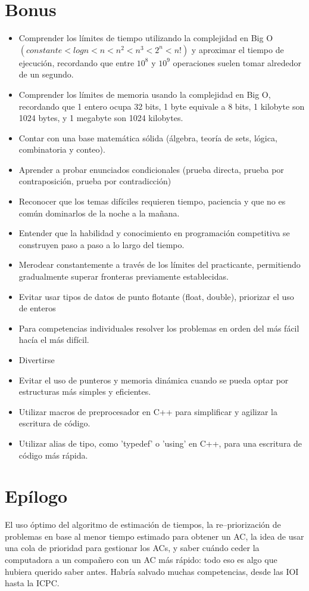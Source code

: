\section*{Bonus}
{
\begin{itemize}[leftmargin=*, itemsep=0.3em, topsep=0.3em, parsep=0pt, partopsep=0pt]
    \item Comprender los límites de tiempo utilizando la complejidad en Big O \((constante < log n < n < n^2 < n^3 < 2^n < n!)\) y aproximar el tiempo de ejecución, recordando que entre \(10^8\) y \(10^9\) operaciones suelen tomar alrededor de un segundo.
    \item Comprender los límites de memoria usando la complejidad en Big O, recordando que 1 entero ocupa 32 bits, 1 byte equivale a 8 bits, 1 kilobyte son 1024 bytes, y 1 megabyte son 1024 kilobytes.
    \item Contar con una base matemática sólida (álgebra, teoría de sets, lógica, combinatoria y conteo).
    \item Aprender a probar enunciados condicionales (prueba directa, prueba por contraposición, prueba por contradicción)
    \item Reconocer que los temas difíciles requieren tiempo, paciencia y que no es común dominarlos de la noche a la mañana.
    \item Entender que la habilidad y conocimiento en programación competitiva se construyen paso a paso a lo largo del tiempo.
    \item Merodear constantemente a través de los límites del practicante, permitiendo gradualmente superar fronteras previamente establecidas.
    \item Evitar usar tipos de datos de punto flotante (float, double), priorizar el uso de enteros
    \item Para competencias individuales resolver los problemas en orden del más fácil hacía el más difícil.
    \item Divertirse
    \item Evitar el uso de punteros y memoria dinámica cuando se pueda optar por estructuras más simples y eficientes.
    \item Utilizar macros de preprocesador en C++ para simplificar y agilizar la escritura de código.
    \item Utilizar alias de tipo, como 'typedef' o 'using' en C++, para una escritura de código más rápida.
\end{itemize}
}
\clearpage
\section*{Epílogo} 
El uso óptimo del algoritmo de estimación de tiempos, la re–priorización de problemas en base al menor tiempo estimado para obtener un AC, la idea de usar una cola de prioridad para gestionar los ACs, y saber cuándo ceder la computadora a un compañero con un AC más rápido: todo eso es algo que hubiera querido saber antes. Habría salvado muchas competencias, desde las IOI hasta la ICPC.\\


